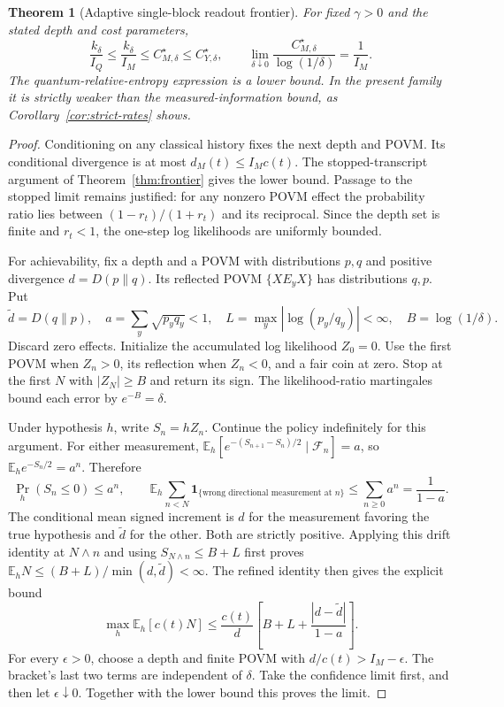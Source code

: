 \documentclass[11pt,a4paper]{article}
\newcommand{\E}{\mathbb E}
\newtheorem{theorem}{Theorem}[section]
\theoremstyle{definition}
\theoremstyle{remark}
\numberwithin{equation}{section}
\begin{document}
\begin{theorem}[Adaptive single-block readout frontier]\label{thm:measured}
For fixed $\gamma>0$ and the stated depth and cost parameters,
\begin{equation}\label{eq:measurement-frontier}
 \frac{k_\delta}{I_Q}\leq\frac{k_\delta}{I_M}
 \leq C_{M,\delta}^\star\leq C_{Y,\delta}^\star,
 \qquad
 \lim_{\delta\downarrow 0}\frac{C_{M,\delta}^\star}{\log(1/\delta)}
 =\frac1{I_M}.
\end{equation}
The quantum-relative-entropy expression is a lower bound. In the present
family it is strictly weaker than the measured-information bound, as
Corollary~\ref{cor:strict-rates} shows.
\end{theorem}
\begin{proof}
Conditioning on any classical history fixes the next depth and POVM.
Its conditional divergence is at most $d_M(t)\leq I_Mc(t)$.
The stopped-transcript argument of Theorem~\ref{thm:frontier} gives
the lower bound. Passage to the stopped limit remains justified: for any
nonzero POVM effect the probability ratio lies between
$(1-r_t)/(1+r_t)$ and its reciprocal. Since the depth set is finite and
$r_t<1$, the one-step log likelihoods are uniformly bounded.

For achievability, fix a depth and a POVM with distributions $p,q$ and
positive divergence $d=D(p\|q)$. Its reflected POVM
$\{XE_yX\}$ has distributions $q,p$. Put
\[
 \widetilde d=D(q\|p),\quad
 a=\sum_y\sqrt{p_yq_y}<1,\quad
 L=\max_y|\log(p_y/q_y)|<\infty,
 \quad B=\log(1/\delta).
\]
Discard zero effects. Initialize the accumulated log likelihood $Z_0=0$.
Use the first POVM when $Z_n>0$, its reflection when $Z_n<0$, and a fair
coin at zero. Stop at the first $N$ with $|Z_N|\geq B$ and return its sign.
The likelihood-ratio martingales bound each error by $e^{-B}=\delta$.

Under hypothesis $h$, write $S_n=hZ_n$. Continue the policy indefinitely
for this argument. For either measurement,
$\E_h[e^{-(S_{n+1}-S_n)/2}\mid\mathcal F_n]=a$, so
$\E_h e^{-S_n/2}=a^n$. Therefore
\[
 \Pr_h(S_n\leq0)\leq a^n,\qquad
 \E_h\sum_{n<N}\mathbf1_{\{\text{wrong directional measurement at }n\}}
 \leq\sum_{n\geq0}a^n=\frac1{1-a}.
\]
The conditional mean signed increment is $d$ for the measurement favoring
the true hypothesis and $\widetilde d$ for the other. Both are strictly
positive. Applying this drift identity at $N\wedge n$ and using
$S_{N\wedge n}\leq B+L$ first proves
$\E_hN\leq(B+L)/\min(d,\widetilde d)<\infty$.
The refined identity then gives the explicit bound
\begin{equation}\label{eq:adaptive-achievable}
 \max_h\E_h[c(t)N]
 \leq\frac{c(t)}d\left[B+L+
                  \frac{|d-\widetilde d|}{1-a}\right].
\end{equation}
For every $\epsilon>0$, choose a depth and finite POVM with
$d/c(t)>I_M-\epsilon$. The bracket's last two terms are independent of
$\delta$. Take the confidence limit first, and then let $\epsilon\downarrow 0$.
Together with the lower bound this proves the limit.
\end{proof}
\end{document}
